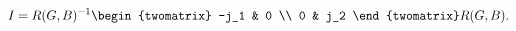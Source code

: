 \begin{equation}
\label{eq:Idiag}
  I = R(G,B)^{-1} \begin{twomatrix}
                     -j_1 &  0 \\
                       0  & j_2
                  \end{twomatrix}
      R(G,B).
\end{equation}

